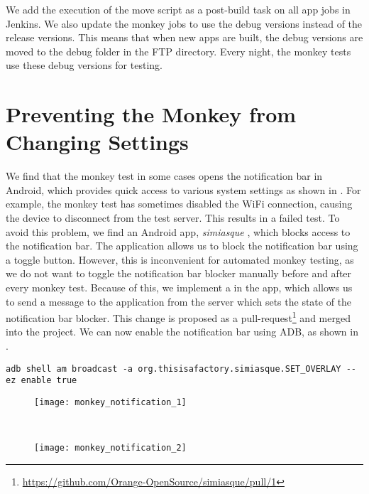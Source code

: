 We add the execution of the move script as a post-build task on all app jobs in Jenkins. We also update the monkey jobs to use the debug versions instead of the release versions. This means that when new apps are built, the debug versions are moved to the debug folder in the FTP directory. Every night, the monkey tests use these debug versions for testing.

\section{Preventing the Monkey from Changing Settings}\label{sec:monkey_simiasque}
We find that the monkey test in some cases opens the notification bar in Android, which provides quick access to various system settings as shown in . For example, the monkey test has sometimes disabled the WiFi connection, causing the device to disconnect from the test server. This results in a failed test. To avoid this problem, we find an Android app, \emph{simiasque} \parencite{simiasque-app}, which blocks access to the notification bar. The application allows us to block the notification bar using a toggle button. However, this is inconvenient for automated monkey testing, as we do not want to toggle the notification bar blocker manually before and after every monkey test. Because of this, we implement a  in the app, which allows us to send a message to the application from the server which sets the state of the notification bar blocker. This change is proposed as a pull-request\footnote{\url{https://github.com/Orange-OpenSource/simiasque/pull/1}} and merged into the project. We can now enable the notification bar using ADB, as shown in .
\begin{lstlisting}[float,label=lst:adb-simiasque-broadcast,caption=Command for enabling the notification bar blocker]
adb shell am broadcast -a org.thisisafactory.simiasque.SET_OVERLAY --ez enable true
\end{lstlisting}

\begin{figure}
\centering
\begin{minipage}{.47\textwidth}
  \centering
  \texttt{[image: monkey\_notification\_1]}
  \label{fig:android_notification_settings}
\end{minipage}
~~~~
\begin{minipage}{.47\textwidth}
  \centering
  \texttt{[image: monkey\_notification\_2]}
  \label{fig:android_notification_blocker}
\end{minipage}
\end{figure}

